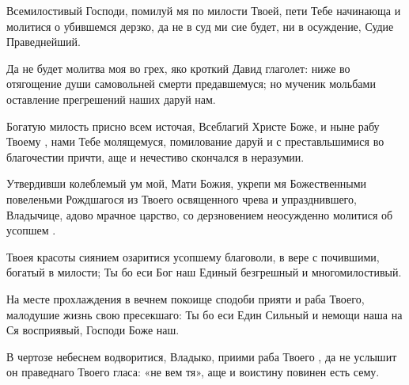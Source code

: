 \begin{mymulticols}


Всемилостивый Господи, помилуй мя по милости Твоей, пети Тебе начинающа и молитися о убившемся дерзко, да не в суд ми сие будет, ни в осуждение, Судие Праведнейший.


Да не будет молитва моя во грех, яко кроткий Давид глаголет: ниже во отягощение души самовольней смерти предавшемуся; но мученик мольбами оставление прегрешений наших даруй нам.

\slava

Богатую милость присно всем источая, Всеблагий Христе Боже, и ныне рабу Твоему , нами Тебе молящемуся, помилование даруй и с преставльшимися во благочестии причти, аще и нечестиво скончался в неразумии.

\inyne

Утвердивши колеблемый ум мой, Мати Божия, укрепи мя Божественными повеленьми Рождшагося из Твоего освященного чрева и упразднившего, Владычице, адово мрачное царство, со дерзновением неосужденно молитися об усопшем . 




Твоея красоты сиянием озаритися усопшему благоволи, в вере с почившими, богатый в милости; Ты бо еси Бог наш Единый безгрешный и многомилостивый.


На месте прохлаждения в вечнем покоище сподоби прияти и раба Твоего, малодушие жизнь свою пресекшаго: Ты бо еси Един Сильный и немощи наша на Ся восприявый, Господи Боже наш.

\slava

В чертозе небеснем водворитися, Владыко, приими раба Твоего , да не услышит он праведнаго Твоего гласа: «не вем тя», аще и воистину повинен есть сему.

\inyne


\end{mymulticols}
